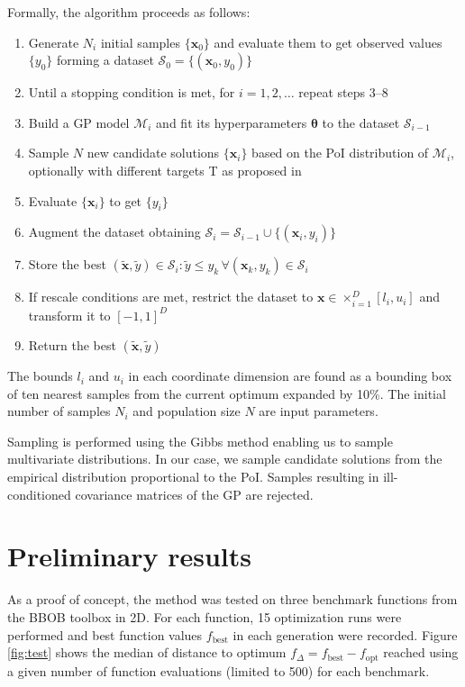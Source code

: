 \documentclass{sig-alt-release2}
\newcommand{\xx}{\mathrm{\mathbf{x}}}
\newcommand{\ttheta}{\mathbf{\theta}}
\begin{document}
Formally, the algorithm proceeds as follows:
\begin{enumerate}[itemsep=-4pt]
  \item Generate $N_i$ initial samples $\{\xx_0\}$ and evaluate them to get observed values $\{y_0\}$ forming a
    dataset $\mathcal{S}_0 = \{(\xx_0, y_0)\}$
  \item Until a stopping condition is met,  for $i = 1, 2, \dots$ repeat steps 3--8
  \item Build a GP model $\mathcal{M}_i$ and fit its hyperparameters $\ttheta$ to the dataset $\mathcal{S}_{i-1}$
  \item Sample $N$ new candidate solutions $\{\xx_i\}$ based on the PoI distribution of $\mathcal{M}_i$, 
    optionally with different targets T as proposed in \cite{jones01taxonomy}
  \item Evaluate $\{\xx_i\}$ to get $\{y_i\}$ 
  \item Augment the dataset obtaining $\mathcal{S}_i = \mathcal{S}_{i-1} \cup \{(\xx_i, y_i)\}$
  \item Store the best $(\tilde{\xx}, \tilde{y}) \in \mathcal{S}_i : \tilde{y} \leq y_k \, \forall (\xx_k, y_k) \in \mathcal{S}_i$  %
  \item If rescale conditions are met, restrict the dataset to $\xx \in \times_{i=1}^D [l_i, u_i]$ and
    transform it to $[-1, 1]^D$
  \item Return the best $(\tilde{\xx}, \tilde{y})$
\end{enumerate}
The bounds $l_i$ and $u_i$ in each coordinate dimension are found as a bounding box of ten nearest samples 
from the current optimum expanded by 10\%. The initial number of samples $N_i$ and population size $N$ are 
input parameters.

Sampling is performed using the Gibbs method \cite{geman1984stochastic} enabling us to sample multivariate 
distributions. In our case, we sample candidate solutions from  the empirical distribution proportional to 
the PoI. Samples resulting in ill-con\-di\-tion\-ed covariance matrices of the GP are rejected.

\section{Preliminary results}

As a proof of concept, the method was tested on three benchmark functions from the BBOB toolbox \cite{hansen2012fun} 
in 2D. For each function, 15 optimization runs were performed and best function values 
$f_{\text{best}}$ in each generation were recorded. Figure \ref{fig:test} shows the median of distance to optimum 
$f_{\Delta} = f_{\text{best}} - f_{\text{opt}}$ reached using a given number of function evaluations (limited to 500)
for each benchmark.
\end{document}
